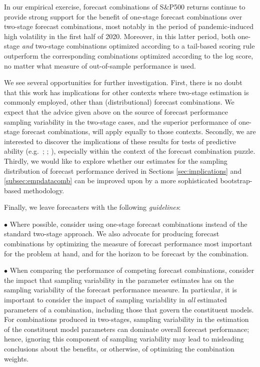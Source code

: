 \documentclass[12pt]{article}
\theoremstyle{definition}
\theoremstyle{remark}
\begin{document}
In our empirical exercise, forecast combinations of S\&P500 returns continue to provide strong support for the benefit of one-stage forecast combinations over two-stage forecast combinations, most notably in the period of pandemic-induced high volatility in the first half of 2020. Moreover, in this latter period, both one-stage \textit{and} two-stage combinations optimized according to a tail-based scoring rule outperform the corresponding combinations optimized according to the log score, no matter what measure of out-of-sample performance is used.

We see several opportunities for further investigation. First, there is no doubt that this work has implications for other contexts where two-stage estimation is commonly employed, other than (distributional) forecast combinations. We expect that the advice given above on the source of forecast performance sampling variability in the two-stage cases, and the superior performance of one-stage forecast combinations, will apply equally to those contexts. Secondly, we are interested to discover the implications of these results for tests of predictive ability (e.g.\ \citealp{Diebold1995}; \citealp{Hansen2005}; \citealp{Giacomini2006}), especially within the context of the forecast combination puzzle. Thirdly, we would like to explore whether our estimates for the sampling distribution of forecast performance derived in Sections \ref{sec:implications} and \ref{subsec:empdatacomb} can be improved upon by a more sophisticated bootstrap-based methodology.

Finally, we leave forecasters with the following \textit{guidelines}:

\smallskip 

\noindent $\bullet$ Where possible, consider using one-stage forecast combinations instead of the standard two-stage approach. We also advocate for producing forecast combinations by optimizing the measure of forecast performance most important for the problem at hand, and for the horizon to be forecast by the combination.

\smallskip 

\noindent $\bullet$ When comparing the performance of competing forecast combinations, consider the impact that sampling variability in the parameter estimates has on the sampling variability of the forecast performance measure. In particular, it is important to consider the impact of sampling variability in \textit{all} estimated parameters of a combination, including those that govern the constituent models. For combinations produced in two-stages, sampling variability in the estimation of the constituent model parameters can dominate overall forecast performance; hence, ignoring this component of sampling variability may lead to misleading conclusions about the benefits, or otherwise, of optimizing the combination weights.
\end{document}

